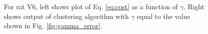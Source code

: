\documentclass[superscriptaddress, twocolumn, prl]{revtex4}
\begin{document}
\begin{figure}
\centering
{}
\caption{For rat V6, left shows plot of Eq. \ref{eq:cost} as a function of $\gamma$. Right shows output of clustering algorithm with $\gamma$ equal to the value shown in Fig. \ref{fig:gamma_error}.}
\end{figure}
\end{document}
